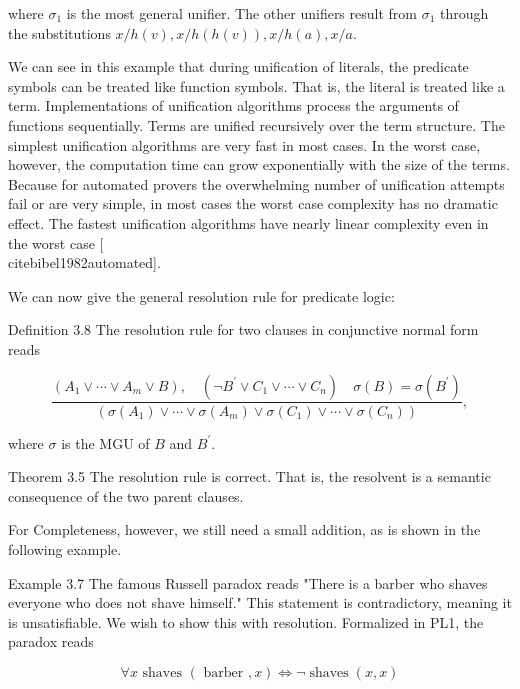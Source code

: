 \documentclass[10pt]{book}
\begin{document}
where $\sigma_{1}$ is the most general unifier. The other unifiers result from $\sigma_{1}$ through the substitutions $x / h(v), x / h(h(v)), x / h(a), x / a$.

We can see in this example that during unification of literals, the predicate symbols can be treated like function symbols. That is, the literal is treated like a term. Implementations of unification algorithms process the arguments of functions sequentially. Terms are unified recursively over the term structure. The simplest unification algorithms are very fast in most cases. In the worst case, however, the computation time can grow exponentially with the size of the terms. Because for automated provers the overwhelming number of unification attempts fail or are very simple, in most cases the worst case complexity has no dramatic effect. The fastest unification algorithms have nearly linear complexity even in the worst case [\\cite{bibel1982automated}].

We can now give the general resolution rule for predicate logic:

Definition 3.8 The resolution rule for two clauses in conjunctive normal form reads


\begin{equation*}
\frac{\left(A_{1} \vee \cdots \vee A_{m} \vee B\right), \quad\left(\neg B^{\prime} \vee C_{1} \vee \cdots \vee C_{n}\right) \quad \sigma(B)=\sigma\left(B^{\prime}\right)}{\left(\sigma\left(A_{1}\right) \vee \cdots \vee \sigma\left(A_{m}\right) \vee \sigma\left(C_{1}\right) \vee \cdots \vee \sigma\left(C_{n}\right)\right)}, \tag{3.6}
\end{equation*}


where $\sigma$ is the MGU of $B$ and $B^{\prime}$.

Theorem 3.5 The resolution rule is correct. That is, the resolvent is a semantic consequence of the two parent clauses.

For Completeness, however, we still need a small addition, as is shown in the following example.


Example 3.7 The famous Russell paradox reads "There is a barber who shaves everyone who does not shave himself." This statement is contradictory, meaning it is unsatisfiable. We wish to show this with resolution. Formalized in PL1, the paradox reads

$$
\forall x \text { shaves }(\text { barber }, x) \Leftrightarrow \neg \operatorname{shaves}(x, x)
$$
\end{document}
